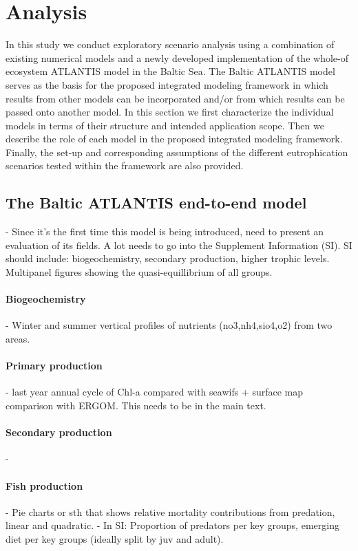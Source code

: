 \documentclass[10pt,letterpaper]{article}
\begin{document}
\section*{Analysis}
In this study we conduct exploratory scenario analysis using a combination of existing numerical models and a newly developed implementation of the whole-of ecosystem ATLANTIS model \citep{FultonE} in the Baltic Sea. The Baltic ATLANTIS model serves as the basis for the proposed integrated modeling framework in which results from other models can be incorporated and/or from which results can be passed onto another model. In this section we first characterize the individual models in terms of their structure and intended application scope. Then we describe the role of each model in the proposed integrated modeling framework. Finally, the set-up and corresponding assumptions of the different eutrophication scenarios tested within the framework are also provided. 

\subsection*{The Baltic ATLANTIS end-to-end model}
    - Since it's the first time this model is being introduced, need to present an evaluation of its fields. A lot needs to go into the Supplement Information (SI). SI should include: biogeochemistry, secondary production, higher trophic levels. Multipanel figures showing the quasi-equillibrium of all groups. 
    \paragraph{Biogeochemistry}
    - Winter and summer vertical profiles of nutrients (no3,nh4,sio4,o2) from two areas. 
    \paragraph{Primary production}
    - last year annual cycle of Chl-a compared with seawifs + surface map comparison with ERGOM. This needs to be in the main text. 
    \paragraph{Secondary production}
    -
    \paragraph{Fish production}
    - Pie charts or sth that shows relative mortality contributions from predation, linear and quadratic.
    - In SI: Proportion of predators per key groups, emerging diet per key groups (ideally split by juv and adult).
    
\end{document}
